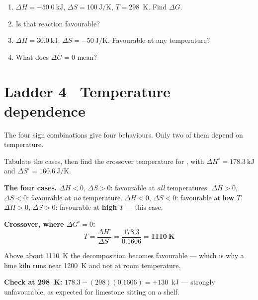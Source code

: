 \documentclass{apchem-worksheet}
\begin{document}
\begin{yourturn}
\begin{enumerate}[leftmargin=*,itemsep=0.5em]
  \item $\Delta H = \SI{-50.0}{\kilo\joule}$,
        $\Delta S = \SI{+100}{\joule\per\kelvin}$, $T = 298$~K. Find
        $\Delta G$. \workspace[1.8cm]
  \item Is that reaction favourable? \workspace[1.4cm]
  \item $\Delta H = \SI{+30.0}{\kilo\joule}$,
        $\Delta S = \SI{-50}{\joule\per\kelvin}$. Favourable at any
        temperature? \workspace[1.8cm]
  \item What does $\Delta G = 0$ mean? \workspace[1.6cm]
\end{enumerate}
\end{yourturn}

\section*{\sffamily Ladder 4 \textbullet\ Temperature dependence}

The four sign combinations give four behaviours. Only two of them depend
on temperature.

\begin{workedexample}
Tabulate the cases, then find the crossover temperature for
, with
$\Delta H^\circ = \SI{+178.3}{\kilo\joule}$ and
$\Delta S^\circ = \SI{+160.6}{\joule\per\kelvin}$.

\textbf{The four cases.}
$\Delta H<0$, $\Delta S>0$: favourable at \emph{all} temperatures.
$\Delta H>0$, $\Delta S<0$: favourable at \emph{no} temperature.
$\Delta H<0$, $\Delta S<0$: favourable at \textbf{low} $T$.
$\Delta H>0$, $\Delta S>0$: favourable at \textbf{high} $T$ --- this case.

\textbf{Crossover, where $\Delta G^\circ = 0$:}
\[ T = \frac{\Delta H^\circ}{\Delta S^\circ} = \frac{178.3}{0.1606}
   = \mathbf{1110~K} \]

Above about \SI{1110}{\kelvin} the decomposition becomes favourable ---
which is why a lime kiln runs near \SI{1200}{\kelvin} and not at room
temperature.

\textbf{Check at \SI{298}{\kelvin}:}
$178.3 - (298)(0.1606) = +130$~kJ --- strongly unfavourable, as expected
for limestone sitting on a shelf.
\end{workedexample}
\end{document}
